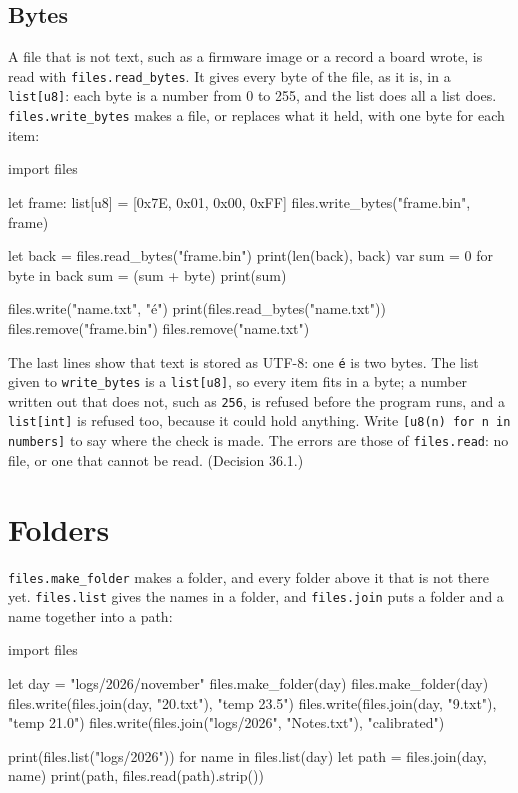 \subsection{Bytes}

A file that is not text, such as a firmware image or a record a board
wrote, is read with \verb|files.read_bytes|. It gives every byte of the
file, as it is, in a \verb|list[u8]|: each byte is a number from 0 to
255, and the list does all a list does. \verb|files.write_bytes| makes
a file, or replaces what it held, with one byte for each item:

\begin{zeno}
import files

let frame: list[u8] = [0x7E, 0x01, 0x00, 0xFF]
files.write_bytes("frame.bin", frame)

let back = files.read_bytes("frame.bin")
print(len(back), back)
var sum = 0
for byte in back {
    sum = (sum + byte) %
}
print(sum)

files.write("name.txt", "é")
print(files.read_bytes("name.txt"))
files.remove("frame.bin")
files.remove("name.txt")
\end{zeno}

The last lines show that text is stored as UTF-8: one \verb|é| is two
bytes. The list given to \verb|write_bytes| is a \verb|list[u8]|, so
every item fits in a byte; a number written out that does not, such as
\verb|256|, is refused before the program runs, and a \verb|list[int]|
is refused too, because it could hold anything. Write
\verb|[u8(n) for n in numbers]| to say where the check is made. The
errors are those of \verb|files.read|: no file, or one that cannot be
read. (Decision 36.1.)

\section{Folders}

\verb|files.make_folder| makes a folder, and every folder above it
that is not there yet. \verb|files.list| gives the names in a folder,
and \verb|files.join| puts a folder and a name together into a path:

\begin{zeno}[file=logs.zeno, dir=folders]
import files

let day = "logs/2026/november"
files.make_folder(day)
files.make_folder(day)
files.write(files.join(day, "20.txt"), "temp 23.5\n")
files.write(files.join(day, "9.txt"), "temp 21.0\n")
files.write(files.join("logs/2026", "Notes.txt"), "calibrated\n")

print(files.list("logs/2026"))
for name in files.list(day) {
    let path = files.join(day, name)
    print(path, files.read(path).strip())
}
\end{zeno}

